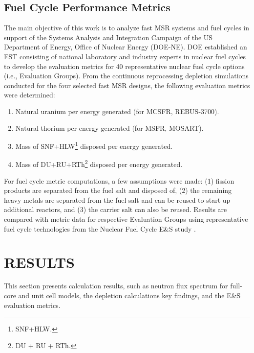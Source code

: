 \documentclass[letterpaper]{mandc2019}
\begin{document}
\subsection{Fuel Cycle Performance Metrics}
The main objective of this work is to analyze fast \gls{MSR} systems and fuel cycles in support of the Systems Analysis and Integration Campaign of the US Department of Energy, Office of Nuclear Energy (DOE-NE). 
DOE established an \gls{EST} consisting of national laboratory and industry experts in nuclear fuel cycles to develop the evaluation metrics for 40 representative nuclear fuel cycle options (i.e., Evaluation Groups). 
From the continuous reprocessing depletion simulations conducted for the four selected fast \gls{MSR} designs, the following evaluation metrics were determined:
\vspace{-0.25in}
\begin{enumerate}
	\item Natural uranium per energy generated (for \gls{MCSFR}, REBUS-3700).\vspace{-0.11in}
	\item Natural thorium per energy generated (for \gls{MSFR}, \gls{MOSART}).\vspace{-0.11in}
	\item Mass of SNF+HLW\footnote{\gls{SNF}+\gls{HLW}.} disposed per energy generated.\vspace{-0.11in}
	\item Mass of DU+RU+RTh\footnote{\gls{DU} + \gls{RU} + \gls{RTh}.} disposed per energy  generated.\vspace{-0.18in}
\end{enumerate}
For fuel cycle metric computations, a few assumptions were made:
(1) fission products are separated from the fuel salt and disposed of,
(2) the remaining heavy metals are separated from the fuel salt and can be reused to start up additional reactors, and
(3) the carrier salt can also be reused.
Results are compared with metric data for respective Evaluation Groups using representative fuel cycle technologies from the Nuclear Fuel Cycle E\&S study \cite{wigeland_nuclear_2014-4}.
\section{RESULTS}
This section presents calculation results, such as neutron flux spectrum for full-core and unit cell models, the depletion calculations key findings, and the E\&S evaluation metrics.
\end{document}
